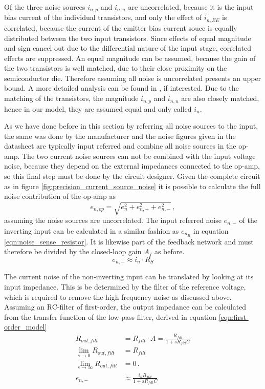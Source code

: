 Of the three noise sources $i_{n,p}$ and $i_{n,n}$ are uncorrelated, because it is the input bias current of the individual transistors, and only the effect of $i_{n,EE}$ is correlated, because the current of the emitter bias current souce is equally distributed between the two input transistors. Since effects of equal magnitude and sign cancel out due to the differential nature of the input stage, correlated effects are suppressed. An equal magnitude can be assumed, because the gain of the two transistors is well matched, due to their close proximity on the semiconductor die. Therefore assuming all noise is uncorrelated presents an upper bound. A more detailed analysis can be found in \cite{op-amp_noise_correlation}, if interested. Due to the matching of the transistors, the magnitude $i_{n,p}$ and $i_{n,n}$ are also closely matched, hence in our model, they are assumed equal and only called $i_n$.

As we have done before in this section by referring all noise sources to the input, the same was done by the manufacturer and the noise figures given in the datasheet are typically input referred and combine all noise sources in the op-amp. The two current noise sources can not be combined with the input voltage noise, because they depend on the external impedances connected to the op-amp, so this final step must be done by the circuit designer. Given the complete circuit as in figure \ref{fig:precision_current_source_noise} it is possible to calculate the full noise contribution of the op-amp as
\begin{equation}
    e_{n,op} = \sqrt{e_n^2 + e_{n,+}^2 + e_{n,-}^2}\,,
\end{equation}
assuming the noise sources are uncorrelated. The input referred noise $e_{n,-}$ of the inverting input can be calculated in a similar fashion as $e_{n_R}$ in equation \ref{eqn:noise_sense_resistor}. It is likewise part of the feedback network and must therefore be divided by the closed-loop gain $A_f$ as before.
\begin{equation}
    e_{n,-} \approx i_n \cdot R_S
\end{equation}

The current noise of the non-inverting input can be translated by looking at its input impedance. This is be determined by the filter of the reference voltage, which is required to remove the high frequency noise as discussed above. Assuming an RC-filter of first-order,
the output impedance can be calculated from the transfer function of the low-pass filter, derived in equation \ref{eqn:first-order_model}
\begin{align}
    R_{out,filt} &= R_{filt} \cdot A = \frac{R_{filt}}{1+sR_{filt}C}  \label{eqn:output_impedance_rc_filter}\\
    \lim_{s \to 0} R_{out,filt} &= R_{filt} \nonumber\\
    \lim_{s \to \infty} R_{out,filt} &= 0 \,.\nonumber\\
     e_{n,-} &\approx \frac{i_n R_{filt}}{1+sR_{filt}C}
\end{align}

